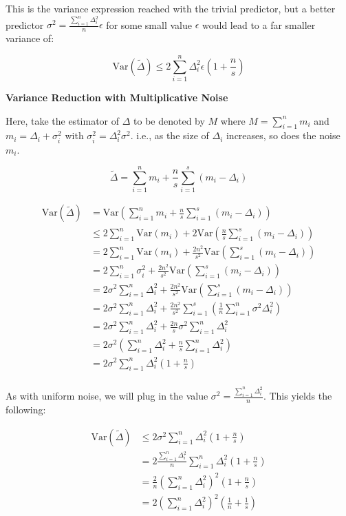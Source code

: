 \documentclass[11pt]{article}
\newcommand{\subsubsubsection}[1]{
  \vspace{1em} %
  \noindent\textbf{#1} %
  \vspace{0.5em} %
}
\begin{document}
This is the variance expression reached with the trivial predictor, but a better predictor $\sigma^2 = \frac{\sum_{i = 1}^{n}\Delta_i^2}{n} \epsilon$ for some small value $\epsilon$ would lead to a far smaller variance of:

\[
\mathrm{Var}(\tilde{\Delta}) \leq 2\sum_{i = 1}^{n}\Delta_i^2 \epsilon (1 + \frac{n}{s})
\]

\subsubsubsection{Variance Reduction with Multiplicative Noise}

Here, take the estimator of $\Delta$ to be denoted by $M$ where $M = \sum_{i = 1}^{n} m_i$ and $m_i = \Delta_i + \sigma_i^2$ with $\sigma_i^2 = \Delta_i^2 \sigma^2$.
i.e., as the size of $\Delta_i$ increases, so does the noise $m_i$.

\[
\tilde{\Delta} = \sum_{i = 1}^{n} m_i + \frac{n}{s} \sum_{i = 1}^{s} (m_i - \Delta_i)
\]

\[
\begin{aligned}
\mathrm{Var}(\tilde{\Delta}) &= \mathrm{Var}( \sum_{i = 1}^{n} m_i + \frac{n}{s} \sum_{i = 1}^{s} (m_i - \Delta_i)) \\
&\leq 2\sum_{i = 1}^{n} \mathrm{Var}(m_i) + 2\mathrm{Var}(\frac{n}{s} \sum_{i = 1}^{s} (m_i - \Delta_i)) \\
&= 2\sum_{i = 1}^{n} \mathrm{Var}(m_i) + \frac{2n^2}{s^2} \mathrm{Var}(\sum_{i = 1}^{s} (m_i - \Delta_i)) \\
&= 2\sum_{i = 1}^{n} \sigma_i^2 + \frac{2n^2}{s^2} \mathrm{Var}(\sum_{i = 1}^{s} (m_i - \Delta_i)) \\
&= 2\sigma^2\sum_{i = 1}^{n} \Delta_i^2 + \frac{2n^2}{s^2} \mathrm{Var}(\sum_{i = 1}^{s} (m_i - \Delta_i)) \\
&= 2\sigma^2\sum_{i = 1}^{n} \Delta_i^2 + \frac{2n^2}{s^2}\sum_{i = 1}^{s} (\frac{1}{n}\sum_{i = 1}^{n}\sigma^2\Delta_i^2) \\
&= 2\sigma^2\sum_{i = 1}^{n} \Delta_i^2 + \frac{2n}{s}\sigma^2\sum_{i = 1}^{n}\Delta_i^2 \\
&= 2\sigma^2(\sum_{i = 1}^{n} \Delta_i^2 + \frac{n}{s}\sum_{i = 1}^{n}\Delta_i^2) \\
&= 2\sigma^2\sum_{i = 1}^{n} \Delta_i^2(1 + \frac{n}{s}) \\
\end{aligned}
\]

As with uniform noise, we will plug in the value $\sigma^2 = \frac{\sum_{i = 1}^{n}\Delta_i^2}{n}$.
This yields the following:

\[
\begin{aligned}
\mathrm{Var}(\tilde{\Delta}) &\leq 2\sigma^2\sum_{i = 1}^{n} \Delta_i^2(1 + \frac{n}{s}) \\
&= 2\frac{\sum_{i = 1}^{n}\Delta_i^2}{n}\sum_{i = 1}^{n} \Delta_i^2(1 + \frac{n}{s}) \\
&= \frac{2}{n}(\sum_{i = 1}^{n}\Delta_i^2)^2(1 + \frac{n}{s}) \\
&= 2(\sum_{i = 1}^{n}\Delta_i^2)^2(\frac{1}{n} + \frac{1}{s}) \\
\end{aligned}
\]
\end{document}
